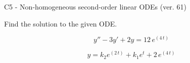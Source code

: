 \begin{exercise}
  \begin{exerciseTitle}C5 - Non-homogeneous second-order linear ODEs (ver. 61)\end{exerciseTitle}
  \begin{exerciseStatement}
    
Find the solution to the given ODE.

    
\[y''-3y'+2y = 12 \, e^{\left(4 \, t\right)}\]

  \end{exerciseStatement}
  \begin{exerciseAnswer}
    
\[y= k_{2} e^{\left(2 \, t\right)} + k_{1} e^{t} + 2 \, e^{\left(4 \, t\right)}\]

  \end{exerciseAnswer}
\end{exercise}